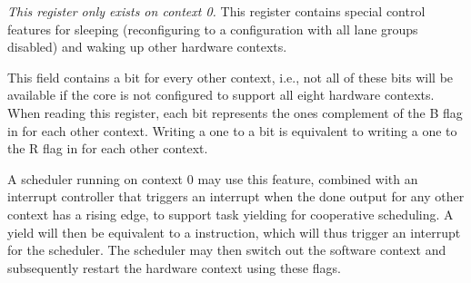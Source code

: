 
\emph{This register only exists on context 0.} This register contains special 
control features for sleeping (reconfiguring to a configuration with all lane 
groups disabled) and waking up other hardware contexts.

This field contains a bit for every other context, i.e., not all of these bits
will be available if the core is not configured to support all eight hardware
contexts. When reading this register, each bit represents the ones complement
of the B flag in  for each other context. Writing a one to a bit is
equivalent to writing a one to the R flag in  for each other context.

A scheduler running on context 0 may use this feature, combined with an
interrupt controller that triggers an interrupt when the done output for any
other context has a rising edge, to support task yielding for cooperative
scheduling. A yield will then be equivalent to a  instruction, which
will thus trigger an interrupt for the scheduler. The scheduler may then
switch out the software context and subsequently restart the hardware context
using these flags.


